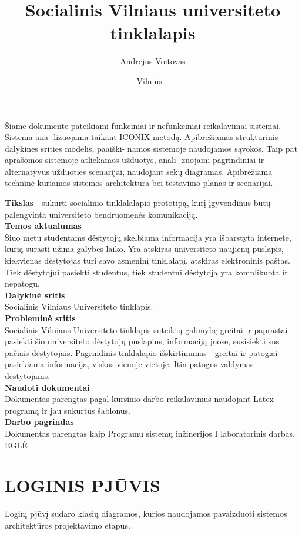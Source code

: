 \documentclass{VUMIFPSkursinis}
\title{Socialinis Vilniaus universiteto tinklalapis}
\author{Andrejus Voitovas}
\date{Vilnius – \the\year}
\begin{document}
\maketitle
\cleardoublepage{}
\setcounter{page}{2}
Šiame dokumente pateikiami funkciniai ir nefunkciniai reikalavimai sistemai. Sistema ana-
lizuojama taikant ICONIX metodą. Apibrėžiamas struktūrinis dalykinės srities modelis, paaiški-
namos sistemoje naudojamos sąvokos. Taip pat aprašomos sistemoje atliekamos užduotys, anali-
zuojami pagrindiniai ir alternatyvūs užduoties scenarijai, naudojant sekų diagramas. Apibrėžiama
techninė kuriamos sistemos architektūra bei testavimo planas ir scenarijai.
\newpage
\tableofcontents

\textbf{Tikslas}  - sukurti socialinio tinklalalapio prototipą, kurį įgyvendinus būtų palengvinta universiteto bendruomenės komunikaciją.\\
\textbf{Temos aktualumas} \\
Šiuo metu studentams dėstytojų skelbiama informacija yra išbarstyta internete, kurią surasti užima galybes laiko. Yra atskiras universiteto naujienų puslapis, kiekvienas dėstytojas turi savo asmeninį tinklalapį, atskiras elektroninis paštas. Tiek dėstytojui pasiekti studentus, tiek studentui dėstytoją yra komplikuota ir nepatogu.\\
\textbf{Dalykinė sritis}\\
Socialinis Vilniaus Universiteto tinklapis.\\
\textbf{Probleminė sritis}\\
Socialinis Vilniaus Universiteto tinklapis suteiktų galimybę greitai ir paprastai pasiekti šio universiteto dėstytojų puslapius, informaciją juose, susisiekti sus pačiais dėstytojais. Pagrindinis tinklalapio išskirtinumas - greitai ir patogiai pasiekiama informacija, viskas vienoje vietoje. Itin patogus valdymas dėstytojams.\\
 \textbf{Naudoti dokumentai}\\
 Dokumentas parengtas pagal kursinio darbo reikalavimus naudojant Latex programą ir jau sukurtus šablonus.\\
 \textbf{Darbo pagrindas} \\ 
Dokumentas parengtas kaip Programų sistemų inžinerijos I laboratorinis darbas.
\newpage
{}
EGLĖ
\newpage
\section{LOGINIS PJŪVIS}
Loginį pjūvį sudaro klasių diagramos, kurios naudojamos pavaizduoti sistemos architektūros projektavimo etapus.
\end{document}
